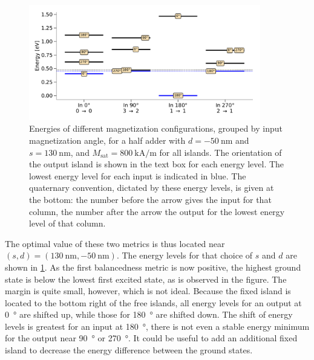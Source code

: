\documentclass[11pt,a4paper,english]{article}
\begin{document}
\begin{figure}
    \centering
    \includegraphics[width=0.9\textwidth]{Figures/half_adder/energylevels/tableside(d50,s130)_energylevels.pdf}
    \caption{Energies of different magnetization configurations, grouped by input magnetization angle, for a half adder with $d=\SI{-50}{\nano\metre}$ and $s=\SI{130}{\nano\metre}$, and $M_\mathrm{sat} = \SI{800}{\kilo\ampere\per\metre}$ for all islands. The orientation of the output island is shown in the text box for each energy level. The lowest energy level for each input is indicated in blue. The quaternary convention, dictated by these energy levels, is given at the bottom: the number before the arrow gives the input for that column, the number after the arrow the output for the lowest energy level of that column.}
    \label{fig:HalfAdder_000006_energylevels_d50_s130}
\end{figure}
The optimal value of these two metrics is thus located near $(s,d)=(\SI{130}{\nano\metre}, \SI{-50}{\nano\metre})$. The energy levels for that choice of $s$ and $d$ are shown in \cref{fig:HalfAdder_000006_energylevels_d50_s130}. As the first balancedness metric is now positive, the highest ground state is below the lowest first excited state, as is observed in the figure. The margin is quite small, however, which is not ideal. Because the fixed island is located to the bottom right of the free islands, all energy levels for an output at \SI{0}{\degree} are shifted up, while those for \SI{180}{\degree} are shifted down. The shift of energy levels is greatest for an input at \SI{180}{\degree}, there is not even a stable energy minimum for the output near \SI{90}{\degree} or \SI{270}{\degree}. It could be useful to add an additional fixed island to decrease the energy difference between the ground states. \par
\end{document}

